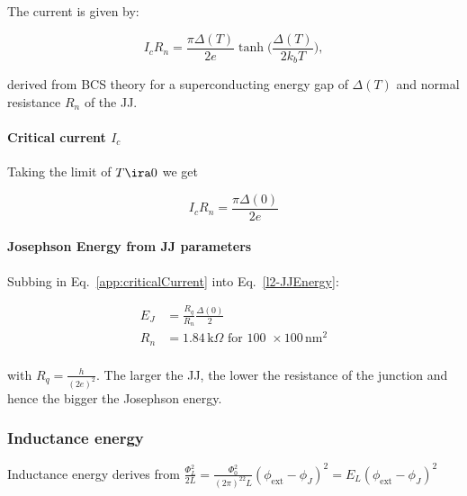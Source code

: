   \noindent The current is given by:

   \begin{equation}\label{introducing-qed-operators-critical-current}
     I_cR_n = \frac{\pi\Delta(T)}{2e}\tanh\big(\frac{\Delta(T)}{2k_bT}\big),
   \end{equation}

   \noindent derived from BCS theory for a superconducting energy gap
   of $ \Delta(T) $ and normal resistance $ R_n $ of the JJ.

   \paragraph{Critical current $ I_c $}
   Taking the limit of $ T\ira0 $ we get

   \begin{equation}\label{app:criticalCurrent}
     I_cR_n = \frac{\pi\Delta(0)}{2e}
   \end{equation}


   \begin{framed}\noindent
     \paragraph{Josephson  Energy  from  JJ  parameters}  Subbing  in
     Eq.~\eqref{app:criticalCurrent} into Eq.~\eqref{l2-JJEnergy}:

     \begin{equation}
       \begin{aligned}
         E_J & = \frac{R_q}{R_n}\frac{\Delta(0)}{2}\\
         R_n & = 1.84\,\text{k}\Omega \text{ for 100 } \times 100\,\text{nm}^2\\
       \end{aligned}
     \end{equation}

     \noindent with  $ R_q =  \frac{h}{(2e)^2} $. The larger  the JJ,
     the lower  the resistance of  the junction and hence  the bigger
     the Josephson energy.

   \end{framed}

   \subsubsection{Inductance energy}
   Inductance             energy             derives             from
   $                       \frac{\Phi_L^2}{2L}                      =
   \frac{\Phi_0^2}{(2\pi)^22L}(\phi_\text{ext}-\phi_J)^2            =
   E_L(\phi_\text{ext}-\phi_J)^2 $

